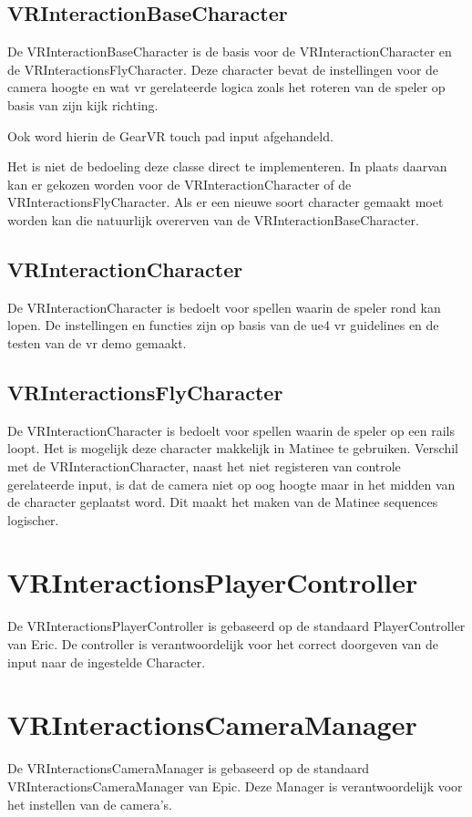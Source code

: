 \subsection{VRInteractionBaseCharacter}
De VRInteractionBaseCharacter is de basis voor de VRInteractionCharacter en de VRInteractionsFlyCharacter. Deze character bevat de instellingen voor de camera hoogte en wat \gls{vr} gerelateerde logica zoals het roteren van de speler op basis van zijn kijk richting.

Ook word hierin de GearVR touch pad input afgehandeld.

Het is niet de bedoeling deze classe direct te implementeren. In plaats daarvan kan er gekozen worden voor de VRInteractionCharacter of de VRInteractionsFlyCharacter. Als er een nieuwe soort character gemaakt moet worden kan die natuurlijk overerven van de VRInteractionBaseCharacter.

\subsection{VRInteractionCharacter}
De VRInteractionCharacter is bedoelt voor spellen waarin de speler rond kan lopen. De instellingen en functies zijn op basis van de \gls{ue4} \gls{vr} guidelines en de testen van de \gls{vr} demo gemaakt.

\subsection{VRInteractionsFlyCharacter}
De VRInteractionCharacter is bedoelt voor spellen waarin de speler op een rails loopt. Het is mogelijk deze character makkelijk in Matinee te gebruiken. Verschil met de VRInteractionCharacter, naast het niet registeren van controle gerelateerde input, is dat de camera niet op oog hoogte maar in het midden van de character geplaatst word. Dit maakt het maken van de Matinee sequences logischer.

\section{VRInteractionsPlayerController}
De VRInteractionsPlayerController is gebaseerd op de standaard PlayerController van Eric. De controller is verantwoordelijk voor het correct doorgeven van de input naar de ingestelde Character.


\section{VRInteractionsCameraManager}
De VRInteractionsCameraManager is gebaseerd op de standaard VRInteractionsCameraManager van Epic. Deze Manager is verantwoordelijk voor het instellen van de camera's.

